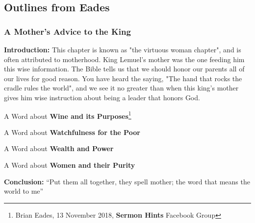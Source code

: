 \subsection{Outlines from Eades}


\subsubsection{A Mother's Advice to the King}



\textbf{Introduction: }This chapter is known as "the virtuous woman chapter", and is often attributed to motherhood. King Lemuel's mother was the one feeding him this wise information. The Bible tells us that we should honor our parents all of our lives for good reason. You have heard the saying, "The hand that rocks the cradle rules the world", and we see it no greater than when this king's mother gives him wise instruction about being a leader that honors God.
\begin{compactenum}[I.]
    \item A Word about \textbf{Wine and its Purposes}\footnote{Brian Eades, 13 November 2018, \textbf{Sermon Hints} Facebook Group}
    \item A Word about \textbf{Watchfulness for the Poor}
    \item A Word about \textbf{Wealth and Power}
    \item A Word about \textbf{Women and their Purity}
\end{compactenum}
\textbf{Conclusion: }``Put them all together, they spell mother; the word that means the world to me''


